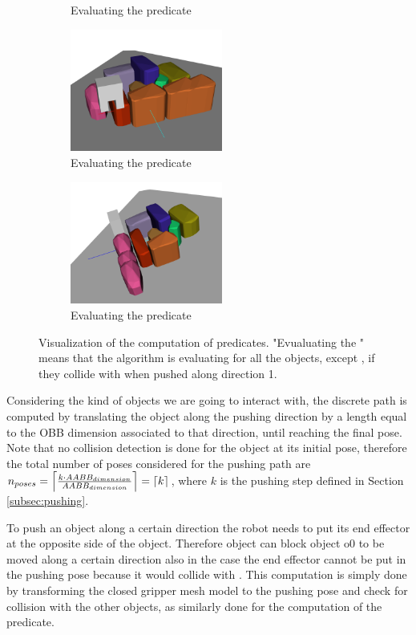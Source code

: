 \begin{figure}[tb]
\begin{subfigure}[t]{5cm}
\caption{Evaluating the  predicate}\label{fig:block_dir_original}
\end{subfigure}
\begin{subfigure}[t]{5cm}
\centering
\includegraphics[width=5cm]{Img/block_dir/pushing44.png}
\caption{Evaluating the  predicate}\label{fig:block_dir_original}
\end{subfigure}
\begin{subfigure}[t]{5cm}
\centering
\includegraphics[width=5cm]{Img/block_dir/pushing55.png}
\caption{Evaluating the  predicate}\label{fig:block_dir_original}
\end{subfigure}
\caption{Visualization of the computation of  predicates. "Evualuating the " means that the algorithm is evaluating for all the objects, except , if they collide with  when pushed along direction 1.}\label{fig:block_dir}
\end{figure}

Considering the kind of objects we are going to interact with, the discrete path  is computed by translating the object along the pushing direction by a length equal to the OBB dimension associated to that direction, until reaching the final pose. Note that no collision detection is done for the object at its initial pose, therefore the total number of poses considered for the pushing path are $n_{poses} = \ceil*{\frac{k \cdot AABB_{dimension}}{AABB_{dimension}}} = \ceil*{k}$, where $k$ is the pushing step defined in Section \ref{subsec:pushing}.

To push an object along a certain direction the robot needs to put its end effector at the opposite side of the object. Therefore object  can block object {o0} to be moved along a certain direction also in the case the end effector cannot be put in the pushing pose because it would collide with . This computation is simply done by transforming the closed gripper mesh model to the pushing pose and check for collision with the other objects, as similarly done for the computation of the  predicate.

